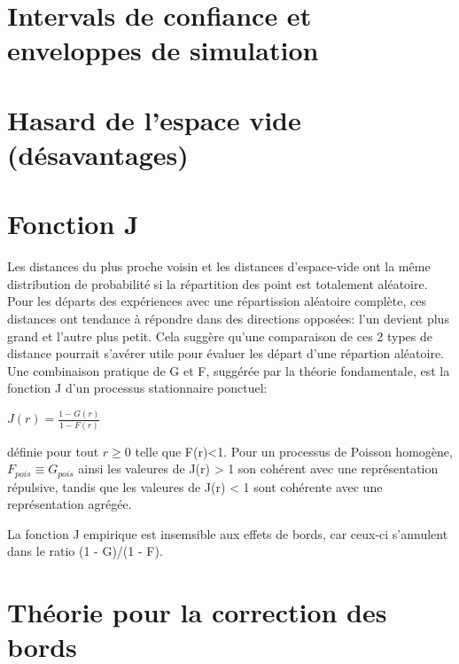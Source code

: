 \documentclass[french,12pt,a4paper]{report}
\begin{document}
\section{Intervals de confiance et enveloppes de simulation}

\section{Hasard de l'espace vide (désavantages)}

\section{Fonction J}

Les distances du plus proche voisin et les distances d'espace-vide ont la même distribution de probabilité si la répartition des point est totalement aléatoire. Pour les départs des expériences avec une répartission aléatoire complète, ces distances ont tendance à répondre dans des directions opposées: l'un devient plus grand et l'autre plus petit. Cela suggère qu'une comparaison de ces 2 types de distance pourrait s'avérer utile pour évaluer les départ d'une répartion aléatoire.\\

Une combinaison pratique de G et F, suggérée par la théorie fondamentale, est la fonction J d'un processus stationnaire ponctuel:
\begin{center}\begin{math} J(r) = \frac{1-G(r)}{1-F(r)} \end{math}\end{center}
définie pour tout \begin{math} r \geq 0 \end{math} telle que F(r)<1. Pour un processus de Poisson homogène, \begin{math} F_{pois} \equiv G_{pois} \end{math} ainsi les valeures de J(r) > 1 son cohérent avec une représentation répulsive, tandis que les valeures de J(r) < 1 sont cohérente avec une représentation agrégée.

La fonction J empirique est insemsible aux effets de bords, car ceux-ci s'annulent dans le ratio (1 - G)/(1 - F).


\section{Théorie pour la correction des bords}
\end{document}
